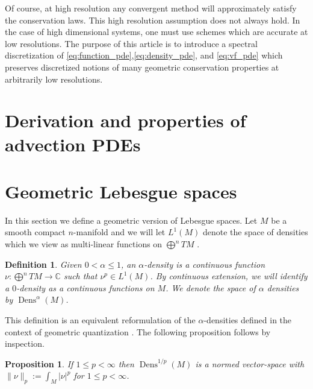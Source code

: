 \documentclass[12pt]{amsart}
\newtheorem{prop}[thm]{Proposition}
\newtheorem{defn}[thm]{Definition}
\DeclareMathOperator{\Dens}{Dens}
\begin{document}
Of course, at high resolution any convergent method will approximately satisfy the conservation laws.
This high resolution assumption does not always hold.
In the case of high dimensional systems, one must use schemes which are accurate at low resolutions.
The purpose of this article is to introduce a spectral discretization of \eqref{eq:function_pde},\eqref{eq:density_pde}, and \eqref{eq:vf_pde}
which preserves discretized notions of many geometric conservation properties at arbitrarily low resolutions.


\section{Derivation and properties of advection PDEs}
\label{sec:properties}


\section{Geometric Lebesgue spaces}
\label{sec:densities}
In this section we define a geometric version of Lebesgue spaces.
Let $M$ be a smooth compact $n$-manifold
and we will let $L^1(M)$ denote the space of densities
which we view as multi-linear functions on $\bigoplus^n TM$ \cite[Chapter 16]{Lee2006}.

\begin{defn}\label{def:p-density}
	Given $0 < \alpha \leq 1$, an $\alpha$-density is a continuous function $\nu : \bigoplus^n TM \to \mathbb{C}$
	such that $\nu^{p} \in L^1(M)$.
	By continuous extension, we will identify a $0$-density as a continuous functions on $M$.
	We denote the space of $\alpha$ densities by $\Dens^{\alpha}(M)$.
\end{defn}

This definition is an equivalent reformulation of the $\alpha$-densities defined in the context of geometric quantization \cite{GuilleminSternberg1970,BatesWeinstein1997}.
The following proposition follows by inspection.
\begin{prop}
	If $1 \leq p < \infty$ then $\Dens^{1/p}(M)$ is a normed vector-space with $\| \nu \|_p := \int_M |\nu|^p$ for $1 \leq p < \infty$.
\end{prop}
\end{document}
